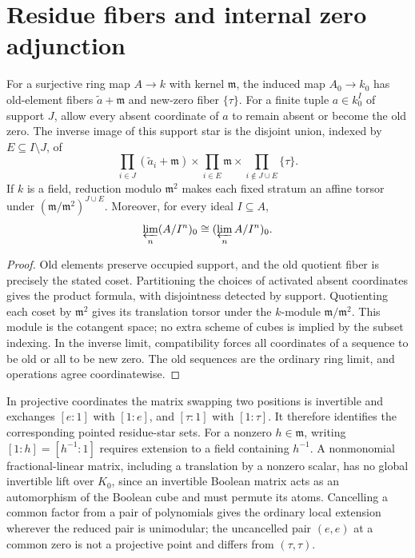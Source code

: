 \section{Residue fibers and internal zero adjunction}
\label{sec:residueinternal}
\begin{proposition}\label{prop:residue-fibers}
For a surjective ring map $A\to k$ with kernel $\mathfrak m$, the induced
map $A_0\to k_0$ has old-element fibers $\widetilde a+\mathfrak m$ and
new-zero fiber $\{\tau\}$. For a finite tuple $a\in k_0^I$ of support $J$,
allow every absent coordinate of $a$ to remain absent or become the old
zero. The inverse image of this support star is the disjoint union,
indexed by $E\subseteq I\setminus J$, of
\[
 \prod_{i\in J}(\widetilde a_i+\mathfrak m)
 \times\prod_{i\in E}\mathfrak m
 \times\prod_{i\notin J\cup E}\{\tau\}.
\]
If $k$ is a field, reduction modulo $\mathfrak m^2$ makes each fixed
stratum an affine torsor under $(\mathfrak m/\mathfrak m^2)^{J\cup E}$.
Moreover, for every ideal $I\subseteq A$,
\[
 \varprojlim_n(A/I^n)_0\cong(\varprojlim_n A/I^n)_0.
\]
\end{proposition}
\begin{proof}
Old elements preserve occupied support, and the old quotient fiber is
precisely the stated coset. Partitioning the choices of activated absent
coordinates gives the product formula, with disjointness detected by
support. Quotienting each coset by $\mathfrak m^2$ gives its translation
torsor under the $k$-module $\mathfrak m/\mathfrak m^2$. This module is the
cotangent space; no extra scheme of cubes is implied by the subset
indexing. In the inverse limit, compatibility forces all coordinates of
a sequence to be old or all to be new zero. The old sequences are the
ordinary ring limit, and operations agree coordinatewise.
\end{proof}

In projective coordinates the matrix swapping two positions is invertible
and exchanges $[e:1]$ with $[1:e]$, and $[\tau:1]$ with $[1:\tau]$.
It therefore identifies the corresponding pointed residue-star sets.
For a nonzero $h\in\mathfrak m$, writing $[1:h]=[h^{-1}:1]$ requires
extension to a field containing $h^{-1}$. A nonmonomial fractional-linear
matrix, including a translation by a nonzero scalar, has no global
invertible lift over $K_0$, since an invertible Boolean matrix acts as an automorphism of the Boolean cube and must permute its atoms.
Cancelling a common factor from a pair of polynomials gives the ordinary
local extension wherever the reduced pair is unimodular; the uncancelled
pair $(e,e)$ at a common zero is not a projective point and differs from
$(\tau,\tau)$.

